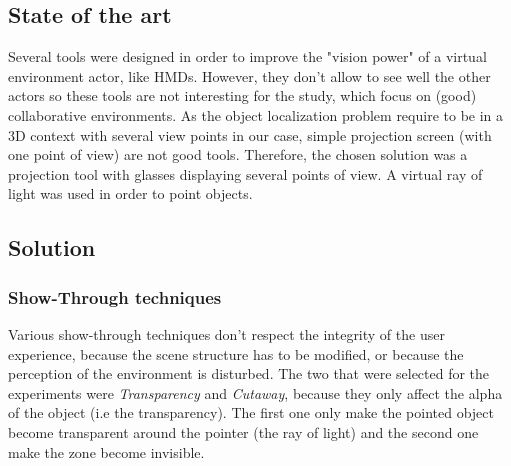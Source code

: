 \documentclass[a4paper]{article}
\begin{document}
\subsection{State of the art}
Several tools were designed in order to improve the "vision power" of a virtual environment actor, like HMDs. However, they don't allow to see well the other actors so these tools are not interesting for the study, which focus on (good) collaborative environments. As the object localization problem require to be in a 3D context with several view points in our case, simple projection screen (with one point of view) are not good tools. Therefore, the chosen solution was a projection tool with glasses displaying several points of view. A virtual ray of light was used in order to point objects.

\subsection{Solution}

\subsubsection{Show-Through techniques}
Various show-through techniques don't respect the integrity of the user experience, because the scene structure has to be modified, or because the perception of the environment is disturbed. The two that were selected for the experiments were \textit{Transparency} and \textit{Cutaway}, because they only affect the alpha of the object (i.e the transparency). The first one only make the pointed object become transparent around the pointer (the ray of light) and the second one make the zone become invisible.
\end{document}
